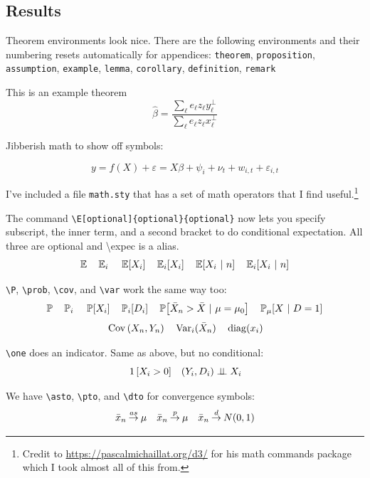 \documentclass[12pt]{article}
\begin{document}
\subsection{Results}

Theorem environments look nice. There are the following environments and their numbering resets automatically for appendices: \texttt{theorem}, \texttt{proposition}, \texttt{assumption}, \texttt{example}, \texttt{lemma}, \texttt{corollary}, \texttt{definition}, \texttt{remark}

\begin{theorem}\label{thm:residue_thm}
  This is an example theorem \[
    \hat{\beta}=\frac{\sum_{\ell}e_{\ell}z_{\ell}y_{\ell}^{\perp}}{\sum_{\ell}e_{\ell}z_{\ell}x_{\ell}^{\perp}}
  \]
\end{theorem}

Jibberish math to show off symbols:

\begin{equation}\label{eq:fe_reg}
  y = f(X) + \varepsilon = X \beta + \psi_i + \nu_t + w_{i,t} + \varepsilon_{i,t}
\end{equation}

I've included a file \texttt{math.sty} that has a set of math operators that I find useful.\footnote{Credit to \url{https://pascalmichaillat.org/d3/} for his math commands package which I took almost all of this from.} 

The command \texttt{\textbackslash E[optional]\{optional\}\{optional\}} now lets you specify subscript, the inner term, and a second bracket to do conditional expectation. All three are optional and \textbackslash expec is a alias.
$$\E \quad \E[i] \quad \E{X_i} \quad \E[i]{X_i} \quad \E{X_i}{n} \quad \E[i]{X_i}{n}$$

\texttt{\textbackslash P}, \texttt{\textbackslash prob}, \texttt{\textbackslash cov}, and \texttt{\textbackslash var} work the same way too:
$$\P \quad \P[i] \quad \P{X_i} \quad \P[i]{D_i} \quad \P{\bar{X}_n > \bar{X}}{\mu = \mu_0} \quad \P[\mu]{X}{D = 1}$$
$$\cov{X_n, Y_n} \quad \var[i](\bar{X}_n) \quad \diag{x_i}$$

\texttt{\textbackslash one} does an indicator. Same as above, but no conditional:
$$\one{X_i > 0} \quad (Y_i, D_i) \indep X_i$$

We have \texttt{\textbackslash asto}, \texttt{\textbackslash pto}, and \texttt{\textbackslash dto} for convergence symbols:
$$\bar{x}_n \mathbin{\overset{as}{\to}} \mu \quad \bar{x}_n \mathbin{\overset{p}{\to}} \mu \quad \bar{x}_n \mathbin{\overset{d}{\to}} N(0, 1)$$
\end{document}
